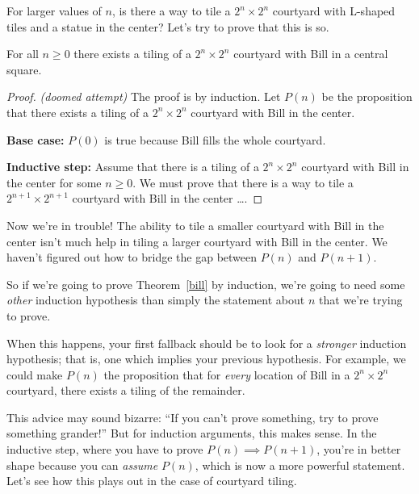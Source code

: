 For larger values of $n$, is there a way to tile a $2^n
\times 2^n$ courtyard with L-shaped tiles and a statue in the center?
Let's try to prove that this is so.

\begin{theorem}\label{bill}
For all $n \geq 0$ there exists a tiling of a $2^n \times 2^n$
courtyard with Bill in a central square.
\end{theorem}

\begin{proof}
{\em (doomed attempt)} The proof is by induction.  Let $P(n)$ be the
proposition that there exists a tiling of a $2^n \times 2^n$ courtyard
with Bill in the center.

\textbf{Base case:} $P(0)$ is true because Bill fills the whole courtyard.

\textbf{Inductive step:} Assume that there is a tiling of a
$2^n \times 2^n$ courtyard with Bill in the center for some $n \geq
0$.  We must prove that there is a way to tile a $2^{n+1} \times
2^{n+1}$ courtyard with Bill in the center \dots.
\end{proof}

Now we're in trouble!  The ability to tile a smaller courtyard with Bill
in the center isn't much help in tiling a larger courtyard with Bill in
the center.  We haven't figured out how to bridge the gap between $P(n)$
and $P(n+1)$.

So if we're going to prove Theorem~\ref{bill} by induction, we're going to
need some \emph{other} induction hypothesis than simply the statement
about $n$ that we're trying to prove.





When this happens, your first fallback should be to look for a
\textit{stronger} induction hypothesis; that is, one which implies
your previous hypothesis.  For example, we could make $P(n)$ the
proposition that for \textit{every} location of Bill in a $2^n \times
2^n$ courtyard, there exists a tiling of the remainder.

This advice may sound bizarre: ``If you can't prove something, try to
prove something grander!''  But for induction arguments, this makes sense.
In the inductive step, where you have to prove $P(n) \implies P(n+1)$,
you're in better shape because you can {\em assume} $P(n)$, which is now a
more powerful statement.  Let's see how this plays out in the case of
courtyard tiling.

